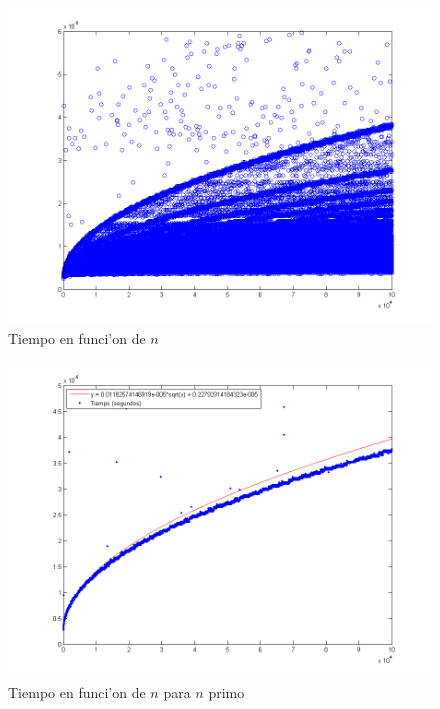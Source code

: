 \begin{figure}[H]
\centering
\includegraphics[scale=0.5]{../../codigo/ejercicio1/benchmark_de_tiempo/graficos/todos_los_numeros/todosLosNumerosPuntosTiempo.png}
\caption{Tiempo en funci'on de $n$}
\end{figure}

\begin{figure}[H]
\centering
\includegraphics[scale=0.5]{../../codigo/ejercicio1/benchmark_de_tiempo/graficos/primos/primosTiempo.png}
\caption{Tiempo en funci'on de $n$ para $n$ primo}
\end{figure}

